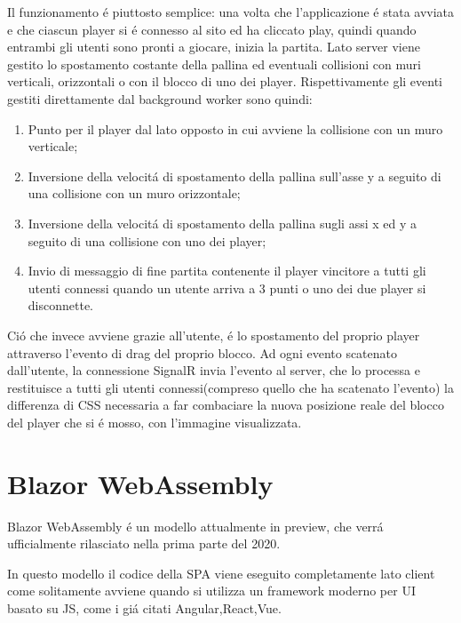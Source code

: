 Il funzionamento \'e piuttosto semplice: una volta che l'applicazione \'e stata avviata e che ciascun player si \'e connesso al sito ed ha cliccato play, quindi quando entrambi gli utenti sono pronti a giocare, inizia la partita.
Lato server viene gestito lo spostamento costante della pallina ed eventuali collisioni con muri verticali, orizzontali o con il blocco di uno dei player.
Rispettivamente gli eventi gestiti direttamente dal background worker sono quindi:
\begin{enumerate}
	\item Punto per il player dal lato opposto in cui avviene la collisione con un muro verticale;
	\item Inversione della velocit\'a di spostamento della pallina sull'asse y a seguito di una collisione con un muro orizzontale;
	\item Inversione della velocit\'a di spostamento della pallina sugli assi x ed y a seguito di una collisione con uno dei player;
	\item Invio di messaggio di fine partita contenente il player vincitore a tutti gli utenti connessi quando un utente arriva a 3 punti o uno dei due player si disconnette.
\end{enumerate}

Ci\'o che invece avviene grazie all'utente, \'e lo spostamento del proprio player attraverso l'evento di drag del proprio blocco.
Ad ogni evento scatenato dall'utente, la connessione SignalR invia l'evento al server, che lo processa e restituisce a tutti gli utenti connessi(compreso quello che ha scatenato l'evento) la differenza di CSS necessaria a far combaciare la nuova posizione reale del blocco del player che si \'e mosso, con l'immagine visualizzata.

\pagebreak

\section{Blazor WebAssembly}\label{sez:bwa}
Blazor WebAssembly \'e un modello attualmente in preview, che verr\'a ufficialmente rilasciato nella prima parte del 2020.

In questo modello il codice della SPA viene eseguito completamente lato client come solitamente avviene quando si utilizza un framework moderno per UI basato su JS, come i gi\'a citati Angular,React,Vue.

